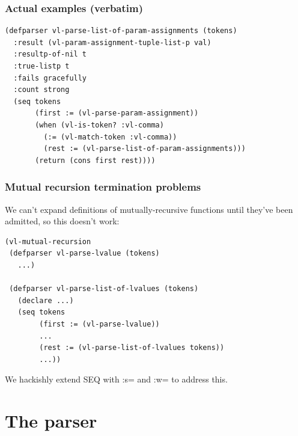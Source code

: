 \documentclass{beamer}
\newcommand{\Highlight}[1]{{\color{Highlight}#1}}
\begin{document}
\begin{frame}[fragile]
\frametitle{Actual examples (verbatim)}

{\small
\begin{verbatim}
(defparser vl-parse-list-of-param-assignments (tokens)
  :result (vl-param-assignment-tuple-list-p val)
  :resultp-of-nil t
  :true-listp t
  :fails gracefully
  :count strong
  (seq tokens
       (first := (vl-parse-param-assignment))
       (when (vl-is-token? :vl-comma)
         (:= (vl-match-token :vl-comma))
         (rest := (vl-parse-list-of-param-assignments)))
       (return (cons first rest))))
\end{verbatim}}
\end{frame}


\begin{frame}[fragile]
\frametitle{Mutual recursion termination problems}

We can't expand definitions of mutually-recursive functions until they've
been admitted, so this doesn't work:

{\small
\begin{verbatim}
(vl-mutual-recursion 
 (defparser vl-parse-lvalue (tokens) 
   ...)

 (defparser vl-parse-list-of-lvalues (tokens)
   (declare ...)
   (seq tokens
        (first := (vl-parse-lvalue))
        ...
        (rest := (vl-parse-list-of-lvalues tokens))
        ...))
\end{verbatim}}

We hackishly extend SEQ with \Highlight{:s=} and \Highlight{:w=} to address this.

\end{frame}



\section{The parser}
\end{document}
